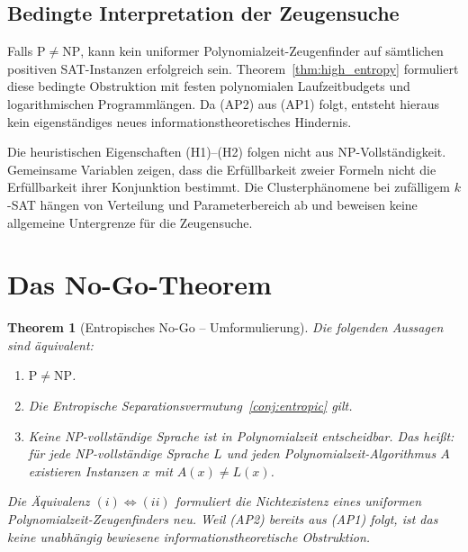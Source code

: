 \documentclass[aps,prd,twocolumn,superscriptaddress,nofootinbib]{revtex4-2}
\newtheorem{theorem}{Theorem}[section]
\theoremstyle{definition}
\theoremstyle{remark}
\newcommand{\NP}{\mathrm{NP}}
\newcommand{\PP}{\mathrm{P}}
\begin{document}
\subsection{Bedingte Interpretation der Zeugensuche}
Falls $\PP\ne\NP$, kann kein uniformer
Polynomialzeit-Zeugenfinder auf sämtlichen positiven
SAT-Instanzen erfolgreich sein.
Theorem~\ref{thm:high_entropy} formuliert
diese bedingte Obstruktion mit festen polynomialen
Laufzeitbudgets und logarithmischen Programmlängen.
Da (AP2) aus (AP1) folgt, entsteht hieraus kein
eigenständiges neues informationstheoretisches Hindernis.

Die heuristischen Eigenschaften (H1)--(H2) folgen
nicht aus NP-Vollständigkeit. Gemeinsame Variablen
zeigen, dass die Erfüllbarkeit zweier Formeln nicht
die Erfüllbarkeit ihrer Konjunktion bestimmt.
Die Clusterphänomene bei zufälligem $k$-SAT hängen
von Verteilung und Parameterbereich ab und beweisen
keine allgemeine Untergrenze für die Zeugensuche.

\section{Das No-Go-Theorem}
\label{sec:nogo}

\begin{theorem}[Entropisches No-Go -- Umformulierung]
\label{thm:nogo}
Die folgenden Aussagen sind äquivalent:
\begin{enumerate}
\item[(i)] $\PP \neq \NP$.
\item[(ii)] Die Entropische Separationsvermutung~\ref{conj:entropic} gilt.
\item[(iii)] Keine NP-vollständige Sprache ist in Polynomialzeit entscheidbar. Das heißt: für jede NP-vollständige Sprache $L$ und jeden Polynomialzeit-Algorithmus $A$ existieren Instanzen $x$ mit $A(x) \neq L(x)$.
\end{enumerate}
Die Äquivalenz $(i) \Leftrightarrow (ii)$ formuliert die Nichtexistenz eines uniformen Polynomialzeit-Zeugenfinders neu. Weil (AP2) bereits aus (AP1) folgt, ist das keine unabhängig bewiesene informationstheoretische Obstruktion.
\end{theorem}
\end{document}
